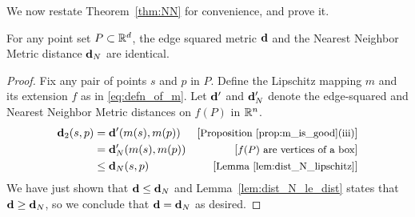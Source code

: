   We now restate Theorem~\ref{thm:NN} for convenience, and prove
  it.
  \begin{theorem}\label{thm:equality}
    For any point set $P\subset\mathbb{R}^d$, the edge squared metric $\mathbf{d}$ and the Nearest Neighbor Metric distance $\mathbf{d}_N$ are identical.
  \end{theorem}
  \begin{proof}
    Fix any pair of points $s$ and $p$ in $P$.
    Define the Lipschitz mapping $m$ and its extension $f$ as in \eqref{eq:defn_of_m}.
    Let $\mathbf{d}'$ and $\mathbf{d}_N'$ denote the edge-squared and Nearest Neighbor Metric distances on $f(P)$ in $\mathbb{R}^n$.
    \begin{align*}
      \mathbf{d}_2(s,p) 
        &= \mathbf{d}'(m(s), m(p)) &\left[\text{\small{Proposition~\ref{prop:m_is_good}(iii)}}\right]\\
        &= \mathbf{d}_N'(m(s), m(p)) &\left[\text{\small{$f(P)$ are vertices of a box}}\right]\\
        &\le \mathbf{d}_N(s, p) &\left[\text{\small{Lemma~\ref{lem:dist_N_lipschitz}}}\right]
    \end{align*}
    We have just shown that $\mathbf{d}\le \mathbf{d}_N$ and Lemma~\ref{lem:dist_N_le_dist} states that $\mathbf{d}\ge \mathbf{d}_N$, so we conclude that $\mathbf{d} = \mathbf{d}_N$ as desired.
  \end{proof}

